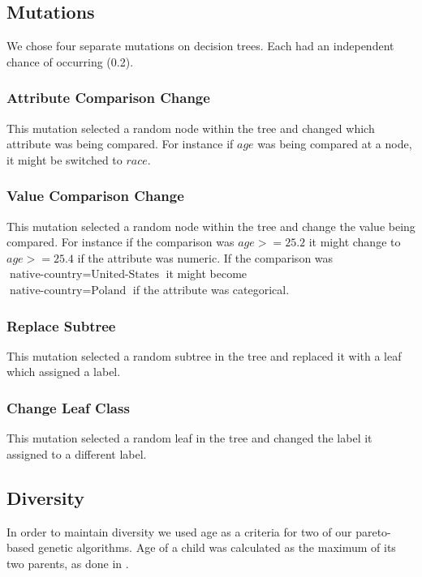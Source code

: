 \documentclass{acm_proc_article-sp}
\begin{document}
\subsection{Mutations}

We chose four separate mutations on decision trees. Each had an independent chance of occurring (0.2).

\subsubsection{Attribute Comparison Change}

This mutation selected a random node within the tree and changed which attribute was being compared. For instance if $age$ was being compared at a node, it might be switched to $race$.

\subsubsection{Value Comparison Change}

This mutation selected a random node within the tree and change the value being compared. For instance if the comparison was $age>=25.2$ it might change to $age>=25.4$ if the attribute was numeric. If the comparison was \\ $\text{native-country} = \text{United-States}$ it might become \\ $\text{native-country} = \text{Poland}$ if the attribute was categorical.

\subsubsection{Replace Subtree}

This mutation selected a random subtree in the tree and replaced it with a leaf which assigned a label.

\subsubsection{Change Leaf Class}

This mutation selected a random leaf in the tree and changed the label it assigned to a different label.

\subsection{Diversity}

In order to maintain diversity we used age as a criteria for two of our pareto-based genetic algorithms. Age of a child was calculated as the maximum of its two parents, as done in \cite{schmidt2011}.
\end{document}
